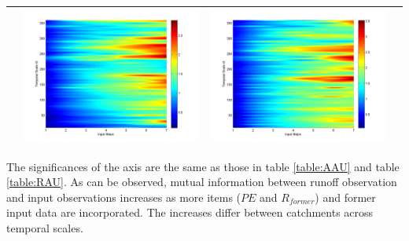 \documentclass[11pt]{article}
\begin{document}
\begin{table}[H]
{\begin{tabular}{cccc}
&\begin{minipage}{.3\textwidth}\includegraphics[width=\linewidth]{resultgraph/06810000pep.png}\end{minipage}
&\begin{minipage}{.3\textwidth}\includegraphics[width=\linewidth]{resultgraph/06810000pepq.png}\end{minipage}
\\
\bottomrule
\end{tabular}
}
\end{table}
The significances of the axis are the same as those in table \ref{table:AAU}
and table \ref{table:RAU}. As can be observed, mutual information between runoff observation and input observations increases as more items ($PE$ and $R_{former}$) and former input data are incorporated. The increases differ between catchments across temporal scales.  
\end{document}
